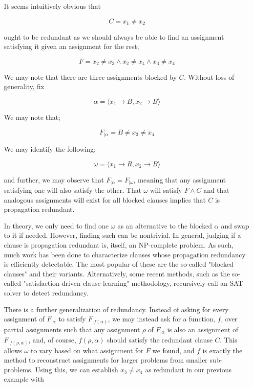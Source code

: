 It seems intuitively obvious that

\begin{equation}
    C = x_1 \neq x_2
\end{equation}

ought to be redundant as we should always be able to find an assignment satisfying it given an assignment for the rest;

\begin{equation}
    F = x_2 \neq x_3 \wedge x_2 \neq x_4\wedge x_3 \neq x_4 
\end{equation}

We may note that there are three assignments blocked by $C$. Without loss of generality, fix

\begin{equation}
    \alpha = \langle x_1 \rightarrow B, x_2 \rightarrow B\rangle
\end{equation}

We may note that;

\begin{equation}
    F_{|\alpha} = B \neq x_3 \neq x_4
\end{equation}

We may identify the following;

\begin{equation}
    \omega = \langle x_1 \rightarrow R, x_2 \rightarrow B\rangle
\end{equation}

and further, we may observe that $F_{|\alpha} = F_{|\omega}$, meaning that any assignment satisfying one will also satisfy the other. That $\omega$ will satisfy $F \wedge C$ and that analogous assignments will exist for all blocked clauses implies that $C$ is propagation redundant.

In theory, we only need to find one $\omega$ as an alternative to the blocked $\alpha$ and swap to it if needed. However, finding such can be nontrivial. In general, judging if a clause is propagation redundant is, itself, an NP-complete problem. As such, much work has been done to characterize clauses whose propagation redundancy is efficiently detectable. The most popular of these are the so-called "blocked clauses" and their variants. Alternatively, some recent methods, such as the so-called "satisfaction-driven clause learning" methodology, recursively call an SAT solver to detect redundancy.

There is a further generalization of redundancy. Instead of asking for every assignment of $F_{|\alpha}$ to satisfy $F_{|f(\alpha)}$, we may instead ask for a function, $f$, over partial assignments such that any assignment $\rho$ of $F_{|\alpha}$ is also an assignment of $F_{|f(\rho, \alpha)}$, and, of course, $f(\rho, \alpha)$ should satisfy the redundant clause $C$. This allows $\omega$ to vary based on what assignment for $F$ we found, and $f$ is exactly the method to reconstruct assignments for larger problems from smaller sub-problems. Using this, we can establish $x_3 \neq x_4$ as redundant in our previous example with 

